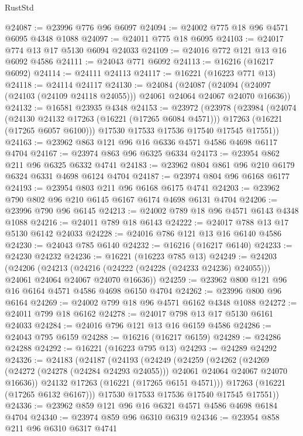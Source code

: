 \begin{lexlean}{RustStd}
\begin{coremodule}
@24087 := @23996 @776 @96 @6097
@24094 := @24002 @775 @18 @96 @4571 @6095 @4348 @1088
@24097 := @24011 @775 @18 @6095
@24103 := @24017 @774 @13 @17 @5130 @6094 @24033
@24109 := @24016 @772 @121 @13 @16 @6092 @4586
@24111 := @24043 @771 @6092
@24113 := @16216 (@16217 @6092)
@24114 := @24111 @24113
@24117 := @16221 (@16223 @771 @13)
@24118 := @24114 @24117
@24130 := @24084
    (@24087 (@24094 (@24097 (@24103 (@24109 @24118 @24055))) @24061 @24064 @24067 @24070 @16636))
@24132 := @16581 @23935 @4348
@24153 := @23972
    (@23978
      (@23984
        (@24074
          (@24130 @24132 @17263 (@16221 (@17265 @6084 @4571)))
          @17263
          (@16221 (@17265 @6057 @6100)))
        @17530
        @17533
        @17536
        @17540
        @17545
        @17551))
@24163 := @23962 @863 @121 @96 @16 @6336 @4571 @4586 @4698 @6117 @4704
@24167 := @23974 @863 @96 @6325 @6334
@24173 := @23954 @862 @211 @96 @6325 @6332 @4741
@24183 := @23962 @804 @861 @96 @210 @6179 @6324 @6331 @4698 @6124 @4704
@24187 := @23974 @804 @96 @6168 @6177
@24193 := @23954 @803 @211 @96 @6168 @6175 @4741
@24203 := @23962 @790 @802 @96 @210 @6145 @6167 @6174 @4698 @6131 @4704
@24206 := @23996 @790 @96 @6145
@24213 := @24002 @789 @18 @96 @4571 @6143 @4348 @1088
@24216 := @24011 @789 @18 @6143
@24222 := @24017 @788 @13 @17 @5130 @6142 @24033
@24228 := @24016 @786 @121 @13 @16 @6140 @4586
@24230 := @24043 @785 @6140
@24232 := @16216 (@16217 @6140)
@24233 := @24230 @24232
@24236 := @16221 (@16223 @785 @13)
@24249 := @24203
    (@24206
      (@24213 (@24216 (@24222 (@24228 (@24233 @24236) @24055))) @24061 @24064 @24067 @24070 @16636))
@24259 := @23962 @800 @121 @96 @16 @6164 @4571 @4586 @4698 @6150 @4704
@24262 := @23996 @800 @96 @6164
@24269 := @24002 @799 @18 @96 @4571 @6162 @4348 @1088
@24272 := @24011 @799 @18 @6162
@24278 := @24017 @798 @13 @17 @5130 @6161 @24033
@24284 := @24016 @796 @121 @13 @16 @6159 @4586
@24286 := @24043 @795 @6159
@24288 := @16216 (@16217 @6159)
@24289 := @24286 @24288
@24292 := @16221 (@16223 @795 @13)
@24293 := @24289 @24292
@24326 := @24183
    (@24187
      (@24193
        (@24249
          (@24259
            (@24262
              (@24269 (@24272 (@24278 (@24284 @24293 @24055))) @24061 @24064 @24067 @24070 @16636))
            @24132
            @17263
            (@16221 (@17265 @6151 @4571)))
          @17263
          (@16221 (@17265 @6132 @6167)))
        @17530
        @17533
        @17536
        @17540
        @17545
        @17551))
@24336 := @23962 @859 @121 @96 @16 @6321 @4571 @4586 @4698 @6184 @4704
@24340 := @23974 @859 @96 @6310 @6319
@24346 := @23954 @858 @211 @96 @6310 @6317 @4741

\end{coremodule}
\end{lexlean}
